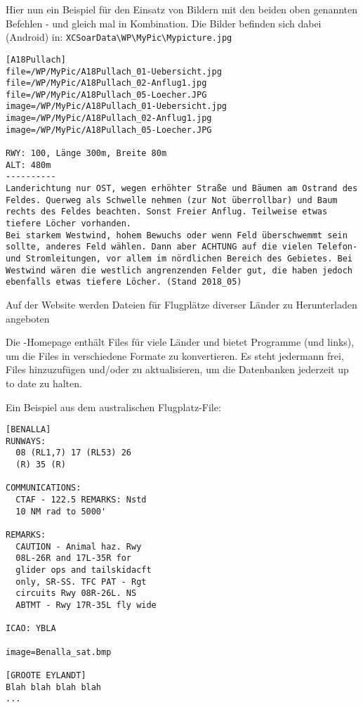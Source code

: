 Hier nun ein Beispiel für den Einsatz von Bildern mit den beiden oben genannten Befehlen - und gleich mal in Kombination. Die Bilder befinden sich dabei (Android) in: \verb|XCSoarData\WP\MyPic\Mypicture.jpg| 

\begin{verbatim}
[A18Pullach]
file=/WP/MyPic/A18Pullach_01-Uebersicht.jpg
file=/WP/MyPic/A18Pullach_02-Anflug1.jpg
file=/WP/MyPic/A18Pullach_05-Loecher.JPG
image=/WP/MyPic/A18Pullach_01-Uebersicht.jpg
image=/WP/MyPic/A18Pullach_02-Anflug1.jpg
image=/WP/MyPic/A18Pullach_05-Loecher.JPG

RWY: 100, Länge 300m, Breite 80m
ALT: 480m
----------
Landerichtung nur OST, wegen erhöhter Straße und Bäumen am Ostrand des Feldes. Querweg als Schwelle nehmen (zur Not überrollbar) und Baum rechts des Feldes beachten. Sonst Freier Anflug. Teilweise etwas tiefere Löcher vorhanden.
Bei starkem Westwind, hohem Bewuchs oder wenn Feld überschwemmt sein sollte, anderes Feld wählen. Dann aber ACHTUNG auf die vielen Telefon- und Stromleitungen, vor allem im nördlichen Bereich des Gebietes. Bei Westwind wären die westlich angrenzenden Felder gut, die haben jedoch ebenfalls etwas tiefere Löcher. (Stand 2018_05) 
\end{verbatim}



Auf der \xc Website werden Dateien für Flugplätze diverser Länder zu Herunterladen angeboten


Die \xc-Homepage enthält Files für viele Länder und bietet Programme (und links), um die
Files in verschiedene Formate zu konvertieren.  Es steht jedermann frei, Files hinzuzufügen und/oder zu aktualisieren,
um die Datenbanken jederzeit up to date zu halten.

Ein Beispiel aus dem australischen Flugplatz-File:
\begin{verbatim}
[BENALLA]
RUNWAYS:
  08 (RL1,7) 17 (RL53) 26
  (R) 35 (R)

COMMUNICATIONS:
  CTAF - 122.5 REMARKS: Nstd
  10 NM rad to 5000'

REMARKS:
  CAUTION - Animal haz. Rwy
  08L-26R and 17L-35R for
  glider ops and tailskidacft
  only, SR-SS. TFC PAT - Rgt
  circuits Rwy 08R-26L. NS
  ABTMT - Rwy 17R-35L fly wide

ICAO: YBLA

image=Benalla_sat.bmp

[GROOTE EYLANDT]
Blah blah blah blah
...
\end{verbatim}


